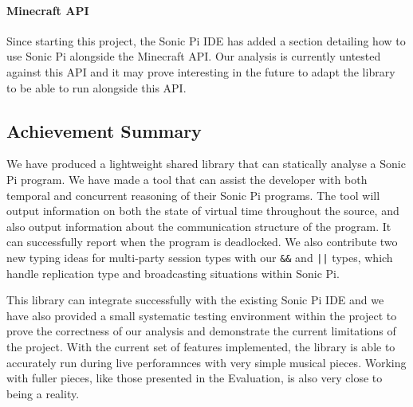 \documentclass[11pt, abstracton, twoside, titlepage=true]{scrartcl}
\begin{document}
\paragraph{Minecraft API}
Since starting this project, the Sonic Pi IDE has added a section detailing how 
to use Sonic Pi alongside the Minecraft API. Our analysis is currently untested 
against this API and it may prove interesting in the future to adapt the library 
to be able to run alongside this API. 

\subsection{Achievement Summary}
We have produced a lightweight shared library that can statically analyse a 
Sonic Pi program. We have made a tool that can assist the developer with both temporal 
and concurrent reasoning of their Sonic Pi programs. The tool will output information 
on both the state of virtual time throughout the source, and also output information 
about the communication structure of the program. It can successfully report when 
the program is deadlocked. We also contribute two new typing ideas for multi-party 
session types with our \texttt{\&\&} and \texttt{||} types, which handle replication 
type and broadcasting situations within Sonic Pi. 

This library can integrate successfully with the existing Sonic Pi IDE and we 
have also provided a small systematic testing environment within the project 
to prove the correctness of our analysis and demonstrate the current limitations 
of the project. With the current set of features implemented, the library is able 
to accurately run during live perforamnces with very simple musical pieces. Working 
with fuller pieces, like those presented in the Evaluation, is also very close to 
being a reality.
\newpage
\end{document}
